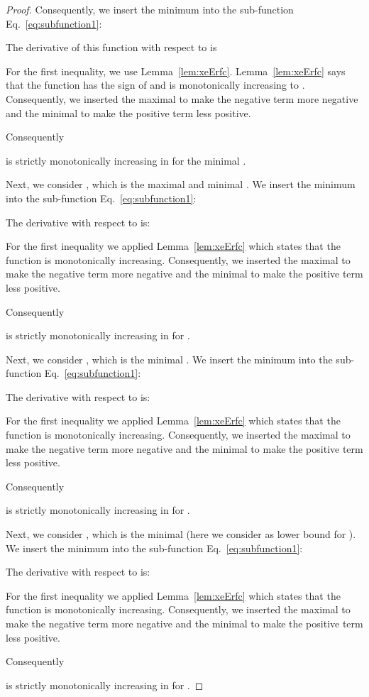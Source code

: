 \documentclass{article}
\begin{document}
\begin{proof}
Consequently, we insert the minimum  into the sub-function
Eq.~\eqref{eq:subfunction1}:

The derivative of this function with respect to  is

For the first inequality, we use Lemma~\ref{lem:xeErfc}.
Lemma~\ref{lem:xeErfc} says that 
the function  has the sign of  and is
monotonically increasing to .
Consequently, we inserted the maximal  to
make the negative term more negative and the minimal 
to make the positive term less positive.


Consequently 

is strictly monotonically increasing in  for the minimal
. 


Next, we consider , which is the maximal 
and minimal .
We insert the minimum  into the  sub-function
Eq.~\eqref{eq:subfunction1}:

The derivative with respect to  is:

For the first inequality we applied Lemma~\ref{lem:xeErfc}
which states that the function  is
monotonically increasing.
Consequently, we inserted the maximal  to
make the negative term more negative and the minimal 
to make the positive term less positive.

Consequently 

is strictly monotonically increasing in  for . 


Next, we consider , which is the minimal .
We insert the minimum  into the  sub-function
Eq.~\eqref{eq:subfunction1}:

The derivative with respect to  is:

For the first inequality we applied Lemma~\ref{lem:xeErfc}
which states that the function  is
monotonically increasing.
Consequently, we inserted the maximal  to
make the negative term more negative and the minimal 
to make the positive term less positive.

Consequently 

is strictly monotonically increasing in  for . 


Next, we consider , which is the minimal
 (here we consider  as lower bound for ).
We insert the minimum  into the  sub-function
Eq.~\eqref{eq:subfunction1}:

The derivative with respect to  is: 

For the first inequality we applied Lemma~\ref{lem:xeErfc}
which states that the function  is
monotonically increasing.
Consequently, we inserted the maximal  to
make the negative term more negative and the minimal 
to make the positive term less positive.

Consequently 

is strictly monotonically increasing in  for . 
\end{proof}
\end{document}
